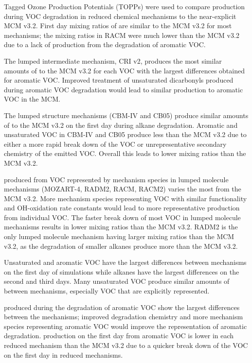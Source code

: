Tagged Ozone Production Potentials (TOPPs) were used to compare  production during VOC degradation in reduced chemical mechanisms to the near-explicit MCM v3.2. 
First day mixing ratios of  are similar to the MCM v3.2 for most mechanisms; the  mixing ratios in RACM were much lower than the MCM v3.2 due to a lack of  production from the degradation of aromatic VOC.

The lumped intermediate mechanism, CRI v2, produces the most similar amounts of  to the MCM v3.2 for each VOC with the largest differences obtained for aromatic VOC.
Improved treatment of unsaturated dicarbonyls produced during aromatic VOC degradation would lead to similar  production to aromatic VOC in the MCM.

The lumped structure mechanisms (CBM-IV and CB05) produce similar amounts of  to the MCM v3.2 on the first day during alkane degradation.
Aromatic and unsaturated VOC in CBM-IV and CB05 produce less  than the MCM v3.2 due to either a more rapid break down of the VOC or unrepresentative secondary chemistry of the emitted VOC.
Overall this leads to lower  mixing ratios than the MCM v3.2.

 produced from VOC represented by mechanism species in lumped molecule mechanisms (MOZART-4, RADM2, RACM, RACM2) varies the most from the MCM v3.2.
More mechanism species representing VOC with similar functionality and OH-oxidation rate constants would lead to more representative  production from individual VOC.
The faster break down of most VOC in lumped molecule mechanisms results in lower  mixing ratios than the MCM v3.2.
RADM2 is the only lumped molecule mechanism having larger  mixing ratios than the MCM v3.2, as the degradation of smaller alkanes produce more  than the MCM v3.2.

Unsaturated and aromatic VOC have the largest differences between mechanisms on the first day of simulations while alkanes have the largest differences on the second and third days.
Many unsaturated VOC produce similar amounts of  between mechanisms, especially VOC that are explicitly represented.

 produced during the degradation of aromatic VOC show the largest differences between the mechanisms; improved degradation chemistry and more mechanism species representing aromatic VOC would improve the representation of aromatic degradation.
 production on the first day from aromatic VOC is lower in each reduced mechanism than the MCM v3.2 due to a quicker break down of the VOC on the first day in reduced mechanisms.

